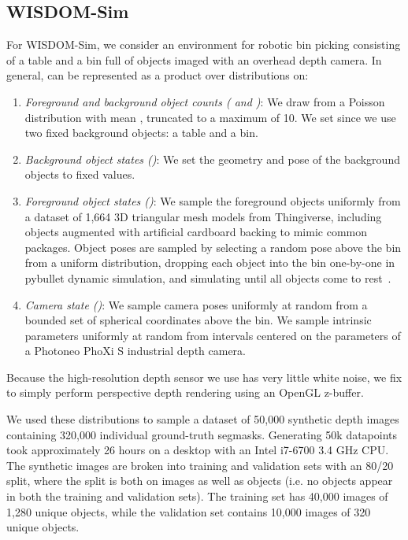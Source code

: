 \documentclass[letterpaper, 10 pt, conference]{ieeeconf}  \pdfoutput=1
\numberwithin{equation}{section}
\begin{document}
\subsection{WISDOM-Sim}
For WISDOM-Sim, we consider an environment for robotic bin picking consisting of a table and a bin full of objects imaged with an overhead depth camera.
In general,  can be represented as a product over distributions on:
\begin{enumerate}
    \item \textit{Foreground and background object counts ( and )}: We draw  from a Poisson distribution with mean , truncated to a maximum of 10. We set  since we use two fixed background objects: a table and a bin.
    \item \textit{Background object states ()}: We set the geometry and pose of the background objects to fixed values.
    \item \textit{Foreground object states ()}: We sample the  foreground objects uniformly from a dataset of 1,664 3D triangular mesh models from Thingiverse, including objects augmented with artificial cardboard backing to mimic common packages. Object poses are sampled by selecting a random pose above the bin from a uniform distribution, dropping each object into the bin one-by-one in pybullet dynamic simulation, and simulating until all objects come to rest~\cite{mahler2017learning}.
    \item \textit{Camera state ()}: We sample camera poses uniformly at random from a bounded set of spherical coordinates above the bin. We sample intrinsic parameters uniformly at random from intervals centered on the parameters of a Photoneo PhoXi S industrial depth camera.
\end{enumerate}
\noindent Because the high-resolution depth sensor we use has very little white noise, we fix  to simply perform perspective depth rendering using an OpenGL z-buffer.



We used these distributions to sample a dataset of 50,000 synthetic depth images containing 320,000 individual ground-truth segmasks.
Generating 50k datapoints took approximately 26 hours on a desktop with an Intel i7-6700 3.4 GHz CPU.
The synthetic images are broken into training and validation sets with an 80/20 split, where the split is both on images as well as objects (i.e. no objects appear in both the training and validation sets). The training set has 40,000 images of 1,280 unique objects, while the validation set contains 10,000 images of 320 unique objects.
\end{document}
